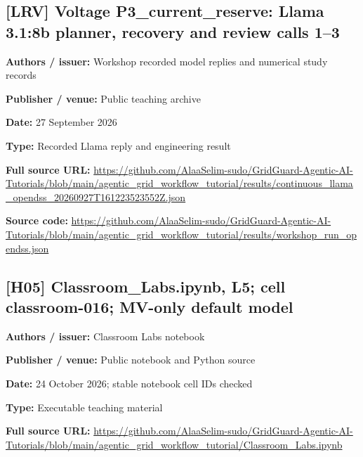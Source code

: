 \documentclass[10pt,letterpaper]{article}
\begin{document}
\subsection*{[LRV] Voltage P3\_current\_reserve: Llama 3.1:8b planner, recovery and review calls 1--3}
\textbf{Authors / issuer:} Workshop recorded model replies and numerical study records\par
\textbf{Publisher / venue:} Public teaching archive\par
\textbf{Date:} 27 September 2026\par
\textbf{Type:} Recorded Llama reply and engineering result\par
\textbf{Full source URL:} \href{https://github.com/AlaaSelim-sudo/GridGuard-Agentic-AI-Tutorials/blob/main/agentic_grid_workflow_tutorial/results/continuous_llama_opendss_20260927T161223523552Z.json}{\small\ttfamily https:/\allowbreak{}/\allowbreak{}github.\allowbreak{}com/\allowbreak{}AlaaSelim-\allowbreak{}sudo/\allowbreak{}GridGuard-\allowbreak{}Agentic-\allowbreak{}AI-\allowbreak{}Tutorials/\allowbreak{}blob/\allowbreak{}main/\allowbreak{}agentic\_\allowbreak{}grid\_\allowbreak{}workflow\_\allowbreak{}tutorial/\allowbreak{}results/\allowbreak{}continuous\_\allowbreak{}llama\_\allowbreak{}opendss\_\allowbreak{}20260927T161223523552Z.\allowbreak{}json}\par
\textbf{Source code:} \href{https://github.com/AlaaSelim-sudo/GridGuard-Agentic-AI-Tutorials/blob/main/agentic_grid_workflow_tutorial/results/workshop_run_opendss.json}{\small\ttfamily https:/\allowbreak{}/\allowbreak{}github.\allowbreak{}com/\allowbreak{}AlaaSelim-\allowbreak{}sudo/\allowbreak{}GridGuard-\allowbreak{}Agentic-\allowbreak{}AI-\allowbreak{}Tutorials/\allowbreak{}blob/\allowbreak{}main/\allowbreak{}agentic\_\allowbreak{}grid\_\allowbreak{}workflow\_\allowbreak{}tutorial/\allowbreak{}results/\allowbreak{}workshop\_\allowbreak{}run\_\allowbreak{}opendss.\allowbreak{}json}\par
\par\medskip
\subsection*{[H05] Classroom\_Labs.ipynb, L5; cell classroom-016; MV-only default model}
\textbf{Authors / issuer:} Classroom Labs notebook\par
\textbf{Publisher / venue:} Public notebook and Python source\par
\textbf{Date:} 24 October 2026; stable notebook cell IDs checked\par
\textbf{Type:} Executable teaching material\par
\textbf{Full source URL:} \href{https://github.com/AlaaSelim-sudo/GridGuard-Agentic-AI-Tutorials/blob/main/agentic_grid_workflow_tutorial/Classroom_Labs.ipynb}{\small\ttfamily https:/\allowbreak{}/\allowbreak{}github.\allowbreak{}com/\allowbreak{}AlaaSelim-\allowbreak{}sudo/\allowbreak{}GridGuard-\allowbreak{}Agentic-\allowbreak{}AI-\allowbreak{}Tutorials/\allowbreak{}blob/\allowbreak{}main/\allowbreak{}agentic\_\allowbreak{}grid\_\allowbreak{}workflow\_\allowbreak{}tutorial/\allowbreak{}Classroom\_\allowbreak{}Labs.\allowbreak{}ipynb}\par
\par\medskip
\end{document}
